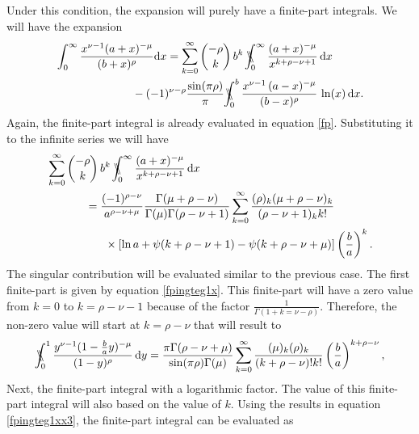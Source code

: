 Under this condition, the expansion will purely have a finite-part integrals. We will have the expansion
\begin{equation}
\begin{split}
 &\int_0^{\infty} \frac{x^{\nu-1} (a+x)^{-\mu}}{(b+x)^{\rho}} \mathrm{d}x =  \sum_{k=0}^{\infty} {- \rho \choose k} \, b^{k} \, \bbint{0}{\infty} \frac{(a+x)^{-\mu}}{x^{k+\rho-\nu+1}} \,\mathrm{d}x
\\
& \hspace{24mm}- (-1)^{\nu-\rho}\frac{\sin(\pi\rho)}{\pi} \bbint{0}{b} \frac{x^{\nu-1} \, (a-x)^{-\mu}}{(b-x)^{\rho}} \, \ln(x)\, \mathrm{d}x.
\label{case4c}
\end{split}
\end{equation}
Again, the finite-part integral is already evaluated in equation \eqref{fp}. Substituting it to the infinite series we will have
\begin{equation}
\begin{split}
&\sum_{k=0}^{\infty} {- \rho \choose k} \, b^{k} \, \bbint{0}{\infty} \frac{(a+x)^{-\mu}}{x^{k+\rho-\nu+1}} \,\mathrm{d}x \\
&\hspace{12mm} = \frac{(-1)^{\rho-\nu}}{a^{\rho-\nu+\mu}} \frac{\Gamma(\mu+\rho-\nu)}{\Gamma(\mu) \Gamma(\rho-\nu+1)} \sum_{k=0}^{\infty} \frac{(\rho)_k (\mu+\rho-\nu)_k}{(\rho-\nu+1)_k k!} \\
&\hspace{18mm}\times\left[\ln{a} +\psi(k+\rho-\nu+1)-\psi(k+\rho-\nu+\mu)\right] \left(\frac{b}{a}\right)^k .
\label{case4cx}
\end{split}
\end{equation}
The singular contribution will be evaluated similar to the previous case. The first finite-part is given by equation \eqref{fpingteg1x}. This finite-part will have a zero value from $k=0$ to $k = \rho-\nu-1$ because of the factor $\frac{1}{\Gamma(1+k=\nu-\rho)}$. Therefore, the non-zero value will start at $k = \rho-\nu$ that will result to
\begin{equation}
\bbint{0}{1} \frac{y^{\nu-1} (1-\frac{b}{a}y)^{-\mu}}{(1-y)^{\rho}}\,\mathrm{d}y = \frac{\pi \Gamma(\rho-\nu+\mu)}{\sin(\pi \rho) \Gamma(\mu)} \sum_{k=0}^{\infty} \frac{(\mu)_k(\rho)_k}{(k+\rho-\nu)!k!} \left(\frac{b}{a}\right)^{k+\rho-\nu} ,
\end{equation}
Next, the finite-part integral with a logarithmic factor. The value of this finite-part integral will also based on the value of $k$. Using the results in equation \eqref{fpingteg1xx3}, the finite-part integral can be evaluated as 
